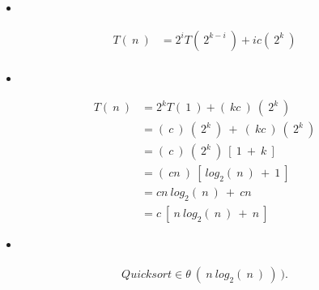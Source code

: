 \begin{itemize}
\item {\bfseries\itshape\color{Violet}{Then:}}
\end{itemize} \hfill

\begin{ceqn}
\begin{align}
T (\ n\ ) &= 2^{i}T (\ 2^{k-i}\ ) + ic(\ 2^{k}\ ) \\
\end{align}
\end{ceqn} 

\pagebreak

\begin{itemize}
\item {\bfseries\itshape\color{Violet}{Let k - i = 0, then k = i:}}
\end{itemize} \hfill

\begin{ceqn}
\begin{align}
T (\ n\ ) &= 2^{k}T (\ 1\ ) + (\ kc\ )\ (\ 2^{k}\ ) \\
&= (\ c\ )\ (\ 2^{k}\ )\ +\ (\ kc\ )\ (\ 2^{k}\ ) \\
&= (\ c\ )\ (\ 2^{k}\ )\ [\ 1\ +\ k\ ] \\
&= (\ cn\ )\ [\ log_{2}(\ n\ )\ +\ 1\ ] \\
&= cn\ log_{2}(\ n\ )\ +\  cn \\
&= c\ [\ n\ log_{2}(\ n\ )\ +\ n\ ]
\end{align}
\end{ceqn} \hfill

\begin{itemize}
\item {\bfseries\itshape\color{Violet}{Finally:}}
\end{itemize} \hfill

\begin{ceqn}
\begin{align}
Quicksort \in \theta\ (\ n\ log_{2} (\ n\ )\ )\ ).
\end{align}
\end{ceqn}

\pagebreak